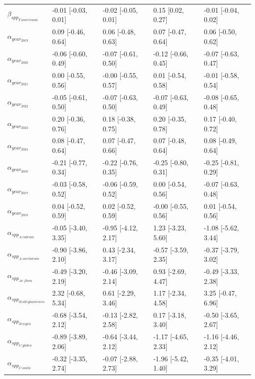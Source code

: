 \begin{table}[ht]
\begin{tabular}{lllll}
  $\beta_{spp_{T. americana}}$ & -0.01 [-0.03, 0.01] & -0.02 [-0.05, 0.01] & 0.15 [0.02, 0.27] & -0.01 [-0.04, 0.02] \\ 
  $\alpha_{year_{2019}}$ & 0.09 [-0.46, 0.64] & 0.06 [-0.48, 0.63] & 0.07 [-0.47, 0.64] & 0.06 [-0.50, 0.62] \\ 
  $\alpha_{year_{2020}}$ & -0.06 [-0.60, 0.49] & -0.07 [-0.61, 0.50] & -0.12 [-0.66, 0.45] & -0.07 [-0.63, 0.47] \\ 
  $\alpha_{year_{2021}}$ & 0.00 [-0.55, 0.56] & -0.00 [-0.55, 0.57] & 0.01 [-0.54, 0.58] & -0.01 [-0.58, 0.54] \\ 
  $\alpha_{year_{2022}}$ & -0.05 [-0.61, 0.50] & -0.07 [-0.63, 0.50] & -0.07 [-0.63, 0.49] & -0.08 [-0.65, 0.48] \\ 
  $\alpha_{year_{2023}}$ & 0.20 [-0.36, 0.76] & 0.18 [-0.38, 0.75] & 0.20 [-0.35, 0.78] & 0.17 [-0.40, 0.72] \\ 
  $\alpha_{year_{2024}}$ & 0.08 [-0.47, 0.64] & 0.07 [-0.47, 0.66] & 0.07 [-0.48, 0.64] & 0.08 [-0.49, 0.64] \\ 
  $\alpha_{year_{2016}}$ & -0.21 [-0.77, 0.34] & -0.22 [-0.76, 0.35] & -0.25 [-0.80, 0.31] & -0.25 [-0.81, 0.29] \\ 
  $\alpha_{year_{2017}}$ & -0.03 [-0.58, 0.52] & -0.06 [-0.59, 0.52] & 0.00 [-0.54, 0.56] & -0.07 [-0.63, 0.48] \\ 
  $\alpha_{year_{2018}}$ & 0.04 [-0.52, 0.59] & 0.02 [-0.52, 0.59] & -0.00 [-0.55, 0.56] & 0.01 [-0.54, 0.56] \\ 
  $\alpha_{spp_{A. rubrum}}$ & -0.05 [-3.40, 3.35] & -0.95 [-4.12, 2.17] & 1.23 [-3.23, 5.60] & -1.08 [-5.62, 3.44] \\ 
  $\alpha_{spp_{A. saccharum}}$ & -0.90 [-3.86, 2.10] & 0.43 [-2.34, 3.17] & -0.57 [-3.59, 2.35] & -0.37 [-3.79, 3.02] \\ 
  $\alpha_{spp_{Ae. flava}}$ & -0.49 [-3.20, 2.19] & -0.46 [-3.09, 2.14] & 0.93 [-2.69, 4.47] & -0.49 [-3.33, 2.38] \\ 
  $\alpha_{spp_{B. alleghaniensis}}$ & 2.32 [-0.68, 5.34] & 0.61 [-2.29, 3.46] & 1.17 [-2.34, 4.58] & 3.25 [-0.47, 6.96] \\ 
  $\alpha_{spp_{B. nigra}}$ & -0.68 [-3.54, 2.12] & -0.13 [-2.82, 2.58] & 0.17 [-3.18, 3.40] & -0.50 [-3.65, 2.67] \\ 
  $\alpha_{spp_{C. glabra}}$ & -0.89 [-3.89, 2.06] & -0.64 [-3.44, 2.12] & -1.17 [-4.65, 2.33] & -1.16 [-4.46, 2.12] \\ 
  $\alpha_{spp_{C. ovata}}$ & -0.32 [-3.35, 2.74] & -0.07 [-2.88, 2.73] & -1.96 [-5.42, 1.40] & -0.35 [-4.01, 3.29] \\ 

\end{tabular}
\end{table}
